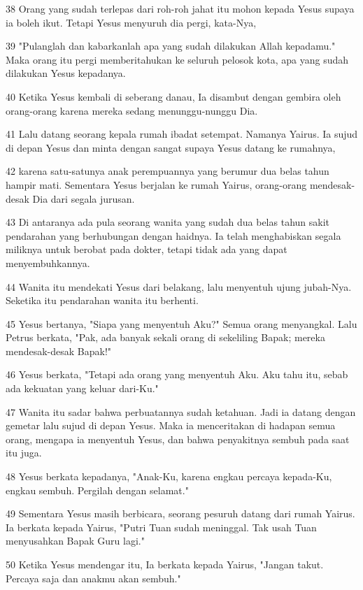 \par 38 Orang yang sudah terlepas dari roh-roh jahat itu mohon kepada Yesus supaya ia boleh ikut. Tetapi Yesus menyuruh dia pergi, kata-Nya,
\par 39 "Pulanglah dan kabarkanlah apa yang sudah dilakukan Allah kepadamu." Maka orang itu pergi memberitahukan ke seluruh pelosok kota, apa yang sudah dilakukan Yesus kepadanya.
\par 40 Ketika Yesus kembali di seberang danau, Ia disambut dengan gembira oleh orang-orang karena mereka sedang menunggu-nunggu Dia.
\par 41 Lalu datang seorang kepala rumah ibadat setempat. Namanya Yairus. Ia sujud di depan Yesus dan minta dengan sangat supaya Yesus datang ke rumahnya,
\par 42 karena satu-satunya anak perempuannya yang berumur dua belas tahun hampir mati. Sementara Yesus berjalan ke rumah Yairus, orang-orang mendesak-desak Dia dari segala jurusan.
\par 43 Di antaranya ada pula seorang wanita yang sudah dua belas tahun sakit pendarahan yang berhubungan dengan haidnya. Ia telah menghabiskan segala miliknya untuk berobat pada dokter, tetapi tidak ada yang dapat menyembuhkannya.
\par 44 Wanita itu mendekati Yesus dari belakang, lalu menyentuh ujung jubah-Nya. Seketika itu pendarahan wanita itu berhenti.
\par 45 Yesus bertanya, "Siapa yang menyentuh Aku?" Semua orang menyangkal. Lalu Petrus berkata, "Pak, ada banyak sekali orang di sekeliling Bapak; mereka mendesak-desak Bapak!"
\par 46 Yesus berkata, "Tetapi ada orang yang menyentuh Aku. Aku tahu itu, sebab ada kekuatan yang keluar dari-Ku."
\par 47 Wanita itu sadar bahwa perbuatannya sudah ketahuan. Jadi ia datang dengan gemetar lalu sujud di depan Yesus. Maka ia menceritakan di hadapan semua orang, mengapa ia menyentuh Yesus, dan bahwa penyakitnya sembuh pada saat itu juga.
\par 48 Yesus berkata kepadanya, "Anak-Ku, karena engkau percaya kepada-Ku, engkau sembuh. Pergilah dengan selamat."
\par 49 Sementara Yesus masih berbicara, seorang pesuruh datang dari rumah Yairus. Ia berkata kepada Yairus, "Putri Tuan sudah meninggal. Tak usah Tuan menyusahkan Bapak Guru lagi."
\par 50 Ketika Yesus mendengar itu, Ia berkata kepada Yairus, "Jangan takut. Percaya saja dan anakmu akan sembuh."
